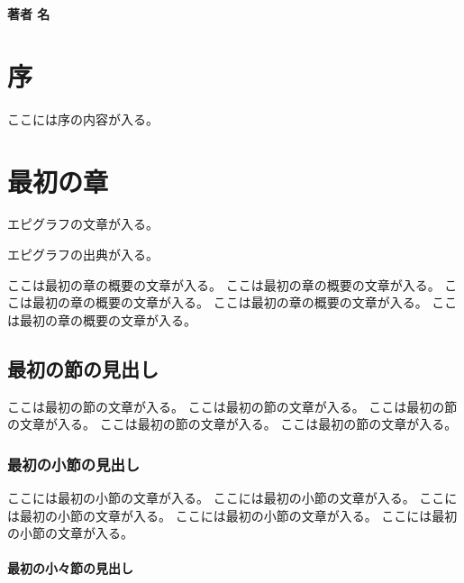 \documentclass[ %
  uplatex,%
  a5paper,%
  papersize%
]{jsbook}
\begin{document}
\begin{titlepage}
  \vspace*{10mm}
  \vfill

  \begin{flushright}
    {\gtfamily\bfseries\huge 著者 名}
  \end{flushright}

  \vspace{20mm}
\end{titlepage}

\frontmatter

\chapter{序}

ここには序の内容が入る。

\tableofcontents %

\mainmatter

\chapter{最初の章}

\epigraph{エピグラフの文章が入る。}{エピグラフの出典が入る。}

\begin{summary}
ここは最初の章の概要の文章が入る。
ここは最初の章の概要の文章が入る。
ここは最初の章の概要の文章が入る。
ここは最初の章の概要の文章が入る。
ここは最初の章の概要の文章が入る。
\end{summary}

\section{最初の節の見出し}

ここは最初の節の文章が入る。
ここは最初の節の文章が入る。
ここは最初の節の文章が入る。
ここは最初の節の文章が入る。
ここは最初の節の文章が入る。

\subsection{最初の小節の見出し}

ここには最初の小節の文章が入る。
ここには最初の小節の文章が入る。
ここには最初の小節の文章が入る。
ここには最初の小節の文章が入る。
ここには最初の小節の文章が入る。

\subsubsection{最初の小々節の見出し}
\end{document}
